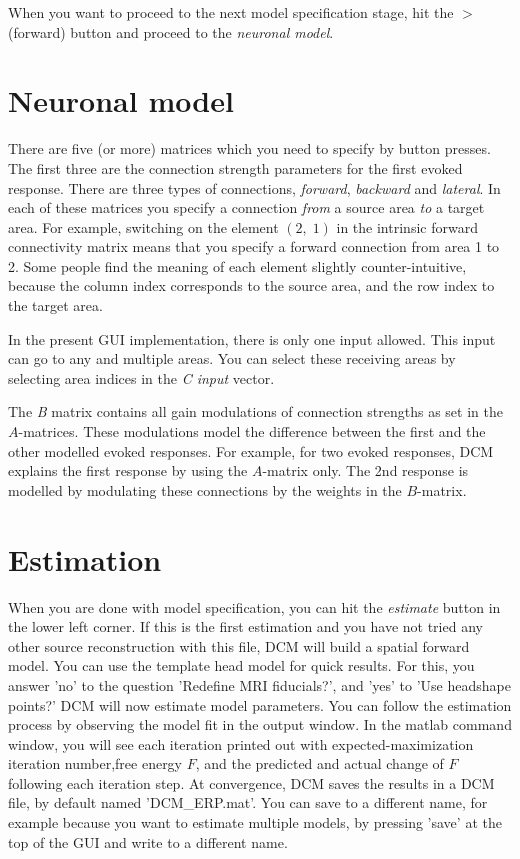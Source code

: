 When you want to proceed to the next model 
specification stage, hit the $>$ (forward) button and proceed
to the \textit{neuronal model}.

\section{Neuronal model}
There are five (or more) matrices which you need to specify by button presses. The
first three are the connection strength parameters for the first
evoked response. There are three types of connections,
\textit{forward}, \textit{backward} and \textit{lateral}. In each of 
these matrices you specify a connection \textit{from} a source area
\textit{to} a target area. For example, switching on the element
$(2,\;1)$ in the intrinsic forward connectivity matrix means that you
specify a forward connection from area 1 to 2. Some people find the
meaning of each element slightly counter-intuitive, because the
column index corresponds to the source area, and the row index to the
target area. 

In the present GUI implementation, there is only one input
allowed. This input can go to any and multiple areas. You can select
these receiving areas by selecting area indices in the \textit{C input} vector.

The \textit{B} matrix contains all gain modulations of connection
strengths as set in the $A$-matrices. These modulations model the
difference between the first and the other modelled evoked
responses. For example, for two evoked responses, DCM explains the
first response by using the $A$-matrix only. The 2nd response is
modelled by modulating these connections by the weights in
the $B$-matrix.

\section{Estimation}
When you are done with model specification, you can hit the
\textit{estimate} button in the lower left corner. If this is the
first estimation and you have not tried any other source
reconstruction with this file, DCM will build a spatial forward
model. You can use the template head model for quick results. For
this, you answer 'no' to the question 'Redefine MRI fiducials?', and
'yes' to 'Use headshape points?' DCM will now
estimate model parameters. You can follow the estimation process by
observing the model fit in the output window. In the matlab command
window, you will see each iteration printed out with
expected-maximization iteration number,free energy $F$, and the
predicted and actual change of $F$ following each iteration
step. At convergence, DCM saves the results in a DCM file, by default
named 'DCM\_ERP.mat'. You can save to a different name, for example
because you want to estimate multiple models, by pressing 'save' at
the top of the GUI and write to a different name. 

